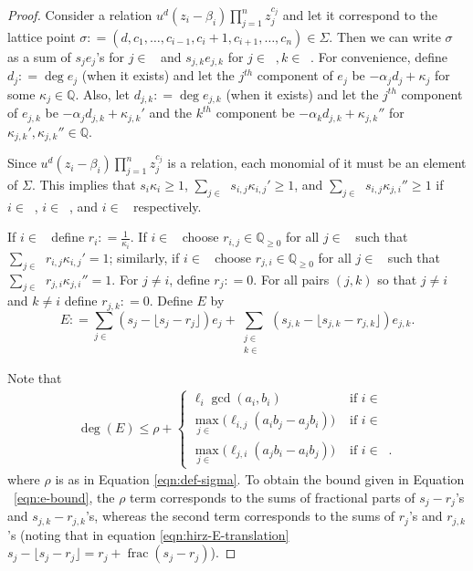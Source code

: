 \documentclass{amsart}
\theoremstyle{plain}
\theoremstyle{definition}
\theoremstyle{remark}
\numberwithin{equation}{section}
\newcommand\bq{{\mathbb Q}}
\newcommand\bida{a}
\newcommand\bidb{b}
\DeclareMathOperator{\fr}{frac}
\DeclareMathOperator{\Te}{T_=}
\DeclareMathOperator{\Tp}{T_+}
\DeclareMathOperator{\Tm}{T_-}
\begin{document}
\begin{proof}
Consider a relation $u^d(z_i - \beta_i)\prod_{j=1}^n z_j^{c_j}$ and let it correspond to the lattice point $\sigma\colon = (d, c_1, \ldots, c_{i-1}, c_{i}+1, c_{i+1}, \ldots, c_n) \in \Sigma$.
Then we can write $\sigma$ as a sum of $s_j e_j$'s for $j\in
\Te$ and $s_{j,k}e_{j,k}$ for $j\in \Tp, k\in \Tm$.  
For convenience, define $d_j \colon = \deg e_j$ (when it exists) and let the $j^{th}$
component of $e_j$ be $-\alpha_j d_j + \kappa_j$ for some $\kappa_j \in \bq$. Also, let $d_{j,k} \colon = \deg e_{j,k}$ (when it exists) and let the $j^{th}$ component of $e_{j,k}$ be $-\alpha_j d_{j,k} + \kappa_{j,k}'$ and the $k^{th}$
component be $-\alpha_k d_{j,k} + \kappa_{j,k}''$ for $\kappa_{j,k}', \kappa_{j,k}'' \in \bq$.

Since $u^d (z_i - \beta_i)\prod_{j=1}^n z_j^{c_j}$ is a relation, each monomial of it must be an element of $\Sigma$. This implies that $s_i\kappa_i\ge 1$, $\sum_{j\in \Tm} s_{i,j}\kappa_{i,j}' \ge 1$, and $\sum_{j\in \Tp} s_{i,j}\kappa_{j,i}'' \ge 1$ if $i\in \Te$, $i\in \Tp$, and $i\in \Tm$ respectively.

If $i\in \Te$ define $r_i \colon = \frac{1}{\kappa_i}$.  If $i\in \Tp$ choose $r_{i,j}\in \bq_{\ge 0}$ for all $j\in \Tm$ such that $\sum_{j\in \Tm} r_{i,j}\kappa_{i,j}' = 1$; similarly, if $i\in \Tm$ choose $r_{j,i}\in \bq_{\ge 0}$ for all $j\in \Tp$ such that $\sum_{j\in \Tm} r_{j,i}\kappa_{j,i}'' = 1$.  For $j\ne i$, define $r_j \colon = 0.$ For all pairs $(j,k)$ so that $j \neq i$ and $k \neq i$ define $r_{j,k} \colon = 0$.
Define $E$ by
\begin{equation}\label{eqn:hirz-E-translation}
	E \colon = \sum_{j\in \Te} (s_j - \lfloor s_j - r_j \rfloor) e_j + \sum_{\substack{j \in 
	\Tp \\ k \in \Tm}} (s_{j,k} - \lfloor s_{j,k} - r_{j,k} \rfloor) e_{j,k}.
\end{equation}


Note that
\begin{align}
\label{eqn:e-bound}
	\deg(E) \le \rho + \begin{cases}
	\ell_i \gcd(\bida_i, \bidb_i)	&\mbox{ if } i \in \Te \\
	\max_{j \in \Tm} \bigl(\ell_{i, j} (\bida_i \bidb_j - \bida_j \bidb_i)\bigr)
	&\mbox{ if } i \in \Tp \\
	\max_{j \in \Tp} \bigl(\ell_{j, i} (\bida_j \bidb_ i - \bida_i \bidb_j) \bigr)
	&\mbox{ if } i \in \Tm. \end{cases}
\end{align}
where $\rho$ is as in Equation \ref{eqn:def-sigma}. To obtain the
bound given in Equation ~\eqref{eqn:e-bound}, the $\rho$ term corresponds to the sums of fractional parts of $s_j - r_j$'s and $s_{j,k} - r_{j,k}$'s, whereas the second term corresponds to the sums of $r_j$'s and $r_{j,k}$'s (noting that in equation \ref{eqn:hirz-E-translation} $s_j - \lfloor s_j - r_j \rfloor= r_j + \fr(s_j - r_j)$).


\end{proof}
\end{document}
